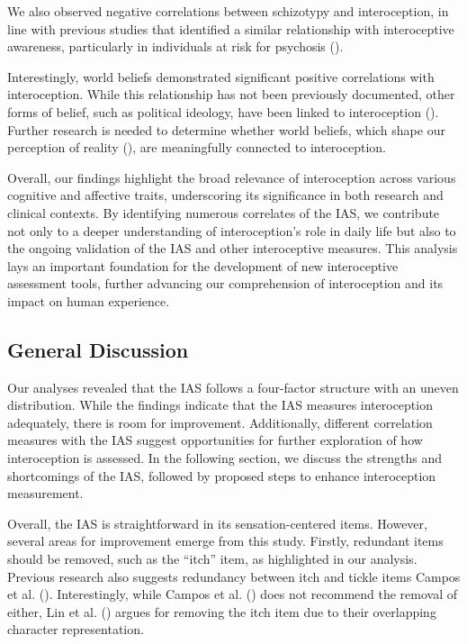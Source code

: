 \documentclass[
  man,
  floatsintext,
  longtable,
  nolmodern,
  notxfonts,
  notimes,
  colorlinks=true,linkcolor=blue,citecolor=blue,urlcolor=blue]{apa7}
\begin{document}
We also observed negative correlations between schizotypy and
interoception, in line with previous studies that identified a similar
relationship with interoceptive awareness, particularly in individuals
at risk for psychosis ().

Interestingly, world beliefs demonstrated significant positive
correlations with interoception. While this relationship has not been
previously documented, other forms of belief, such as political
ideology, have been linked to interoception
(). Further research is
needed to determine whether world beliefs, which shape our perception of
reality (), are meaningfully
connected to interoception.

Overall, our findings highlight the broad relevance of interoception
across various cognitive and affective traits, underscoring its
significance in both research and clinical contexts. By identifying
numerous correlates of the IAS, we contribute not only to a deeper
understanding of interoception's role in daily life but also to the
ongoing validation of the IAS and other interoceptive measures. This
analysis lays an important foundation for the development of new
interoceptive assessment tools, further advancing our comprehension of
interoception and its impact on human experience.

\subsection{General Discussion}\label{general-discussion}

Our analyses revealed that the IAS follows a four-factor structure with
an uneven distribution. While the findings indicate that the IAS
measures interoception adequately, there is room for improvement.
Additionally, different correlation measures with the IAS suggest
opportunities for further exploration of how interoception is assessed.
In the following section, we discuss the strengths and shortcomings of
the IAS, followed by proposed steps to enhance interoception
measurement.

Overall, the IAS is straightforward in its sensation-centered items.
However, several areas for improvement emerge from this study. Firstly,
redundant items should be removed, such as the ``itch'' item, as
highlighted in our analysis. Previous research also suggests redundancy
between itch and tickle items Campos et al.
(). Interestingly, while Campos et al.
() does not recommend the removal of
either, Lin et al. () argues for removing
the itch item due to their overlapping character representation.
\end{document}
